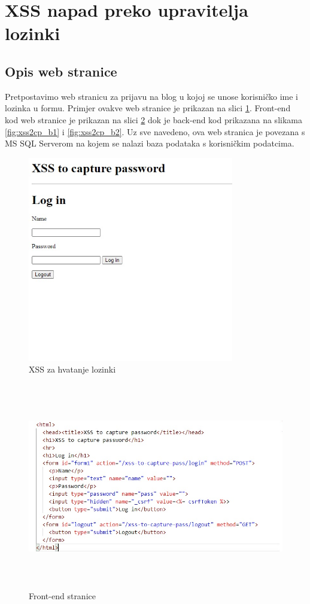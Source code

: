\documentclass[12pt, oneside, onecolumn]{book}
\begin{document}
{\section{XSS napad preko upravitelja lozinki} \label{xss1}
\subsection{Opis web stranice}
Pretpostavimo web stranicu za prijavu na blog u kojoj se unose korisničko ime i lozinka u formu. Primjer ovakve web stranice je prikazan na slici \ref{fig:xss2cp}. Front-end kod web stranice je prikazan na slici \ref{fig:xss2cp_ejs} dok je back-end kod prikazana na slikama \ref{fig:xss2cp_b1} i \ref{fig:xss2cp_b2}. Uz sve navedeno, ova web stranica je povezana s MS SQL Serverom na kojem se nalazi baza podataka s korisničkim podatcima. 

\begin{figure}[H]
	\begin{center}
		\includegraphics[height=9cm]{xss2cp.jpg}
		\caption{XSS za hvatanje lozinki} \label{fig:xss2cp}
	\end{center}
\end{figure}

\begin{figure}[H]
	\begin{center}
		\includegraphics[height=9cm]{xss2cp_ejs.jpg}
		\caption{Front-end stranice} \label{fig:xss2cp_ejs}
	\end{center}
\end{figure}

}
\end{document}
